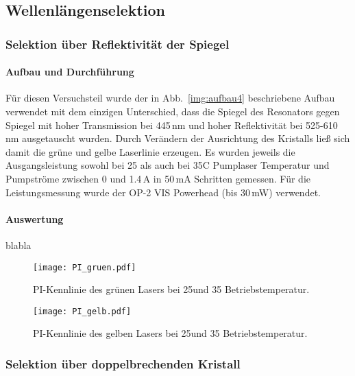 \subsection{Wellenlängenselektion}

\subsubsection{Selektion über Reflektivität der Spiegel}

\paragraph{Aufbau und Durchführung}

Für diesen Versuchsteil wurde der in Abb.~\ref{img:aufbau4} beschriebene Aufbau verwendet mit dem einzigen Unterschied, dass die Spiegel des Resonators gegen Spiegel mit hoher Transmission bei 445\,nm und hoher Reflektivität bei 525-610\,nm ausgetauscht wurden.
Durch Verändern der Ausrichtung des Kristalls ließ sich damit die grüne und gelbe Laserlinie erzeugen. Es wurden jeweils die Ausgangsleistung sowohl bei 25 als auch bei 35\grad C Pumplaser Temperatur und Pumpströme zwischen 0 und 1.4\,A in 50\,mA Schritten gemessen.
Für die Leistungsmessung wurde der OP-2 VIS Powerhead (bis 30\,mW) verwendet.





\paragraph{Auswertung}
blabla

\begin{figure}[H]
\begin{center}
  \texttt{[image: PI\_gruen.pdf]}
  \caption{PI-Kennlinie des grünen Lasers bei 25\grad und 35\grad
  Betriebstemperatur.}
  \label{img:PI_gruen}
\end{center}
\end{figure}


\begin{figure}[H]
\begin{center}
  \texttt{[image: PI\_gelb.pdf]}
  \caption{PI-Kennlinie des gelben Lasers bei 25\grad und 35\grad
  Betriebstemperatur.}
  \label{img:PI_gelb}
\end{center}
\end{figure}



\subsubsection{Selektion über doppelbrechenden Kristall}



